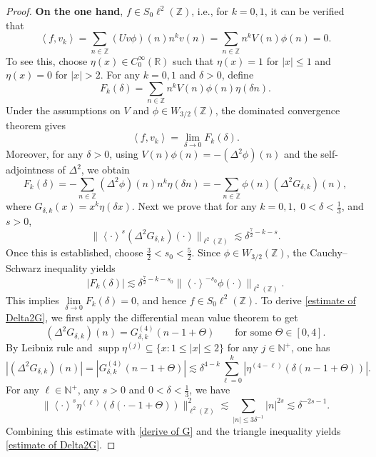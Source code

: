 \documentclass[reqno, 11pt]{amsart}
\newcommand\R{\mathbb{R}}
\newcommand\Z{\mathbb{Z}}
\newcommand\N{\mathbb{N}}
\numberwithin{equation}{section}
\begin{document}
\begin{proof}
\textbf{On the one hand}, $f\in S_0\ell^2(\Z)$, i.e., for $k=0,1$, it can be verified that
$$\left<f,v_k\right>=\sum_{n\in\Z}(Uv\phi)(n)n^kv(n)=\sum_{n\in\Z}n^kV(n)\phi(n)=0.$$
To see this, choose $\eta(x)\in C^{\infty}_0(\R)$ such that $\eta(x)=1$ for $|x|\leq1$ and $\eta(x)=0$ for $|x|>2$. For any $k=0,1$ and $\delta>0$, define
$$F_k(\delta)=\sum_{n\in\Z}n^kV(n)\phi(n)\eta(\delta n).$$
Under the assumptions on $V$ and $\phi\in W_{3/2}(\Z)$, the dominated convergence theorem gives
$$\left<f,v_k\right>=\lim_{\delta\rightarrow0}F_k(\delta).$$
Moreover, for any $\delta>0$, using $V(n)\phi(n)=-(\Delta^2\phi)(n)$ and the self-adjointness of $\Delta^2$, we obtain
$$F_k(\delta)=-\sum_{n\in\Z}(\Delta^2\phi)(n)n^k\eta(\delta n)=-\sum_{n\in\Z}\phi(n)(\Delta^2G_{\delta,k})(n),$$
where $G_{\delta,k}(x)=x^k\eta(\delta x)$. Next we prove that for any $k=0,1,$ $0<\delta<\frac{1}{3}$, and $s>0$,
\begin{equation}\label{estimate of Delta2G}
\|\left<\cdot\right>^s(\Delta^2G_{\delta,k})(\cdot)\|_{\ell^2(\Z)}\lesssim\delta^{\frac{7}{2}-k-s}.
\end{equation}
Once this is established, choose $\frac{3}{2}<s_0<\frac{5}{2}$. Since $\phi\in W_{3/2}(\Z)$, the Cauchy--Schwarz inequality yields
 $$|F_k(\delta)|\lesssim\delta^{\frac{7}{2}-k-s_0}\|\left<\cdot\right>^{-s_0}\phi(\cdot)\|_{\ell^2(\Z)}.$$
 This implies $\lim\limits_{\delta\rightarrow0}F_k(\delta)=0$, and hence $f\in S_0\ell^2(\Z)$.
 To derive \eqref{estimate of Delta2G}, we first apply the differential mean value theorem to get
 $$(\Delta^2G_{\delta,k})(n)=G^{(4)}_{\delta,k}(n-1+\Theta)\qquad\text{for some }\Theta\in[0,4].$$
By Leibniz rule and $\operatorname{supp}\eta^{(j)}\subseteq\{x:1\leq|x|\leq2\}$ for any $j\in\N^{+}$, one has
\begin{equation}\label{derive of G}
\left|(\Delta^2G_{\delta,k})(n)\right|=\left|G^{(4)}_{\delta,k}(n-1+\Theta)\right|\lesssim\delta^{4-k}\sum\limits_{\ell=0}^{k}\left|\eta^{(4-\ell)}(\delta(n-1+\Theta))\right|.
\end{equation}
 For any $\ell\in\N^+$, any $s>0$ and $0<\delta<\frac{1}{3}$, we have
\begin{equation*}
\|\left<\cdot\right>^s\eta^{(\ell)}(\delta(\cdot-1+\Theta))\|^2_{\ell^2(\Z)}\lesssim\sum\limits_{|n|\leq3\delta^{-1}}^{}|n|^{2s}\lesssim\delta^{-2s-1}.
\end{equation*}
Combining this estimate with \eqref{derive of G} and the triangle inequality yields \eqref{estimate of Delta2G}.


\end{proof}
\end{document}
